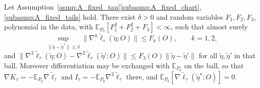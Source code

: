 \documentclass[10pt,a4paper]{amsart}
\newcommand{\E}{\mathbb{E}}
\begin{document}
\begin{lemma}
\label{lem:score_hess_envelopes_fixed_tau_new}
Let Assumption~\ref{asmp:A_fixed_tau}\ref{subasmp:A_fixed_chart}, \ref{subasmp:A_fixed_tails} hold. There exist $\delta>0$ and random variables $F_1,F_2,F_3$, polynomial in the data, with $\E_{P_0}[F_1^2+F_2^2+F_3]<\infty$, such that almost surely
\[
\sup_{\|\tilde\eta-\tilde\eta^\star\|\le\delta}\|\nabla^k\tilde\ell_\tau(\tilde\eta;O)\|\le F_k(O),\qquad k=1,2,
\]
and $\|\nabla^2\tilde\ell_\tau(\tilde\eta;O)-\nabla^2\tilde\ell_\tau(\tilde\eta';O)\|\le F_3(O)\|\tilde\eta-\tilde\eta'\|$ for all $\tilde\eta,\tilde\eta'$ in that ball. Moreover differentiation may be exchanged with $\E_{P_0}$ on the ball, so that
$\nabla K_\tau=-\E_{P_0}\nabla\tilde\ell_\tau$ and $I_\tau=-\E_{P_0}\nabla^2\tilde\ell_\tau$ there, and $\E_{P_0}[\nabla\tilde\ell_\tau(\tilde\eta^\star;O)]=0$.
\end{lemma}
\end{document}
